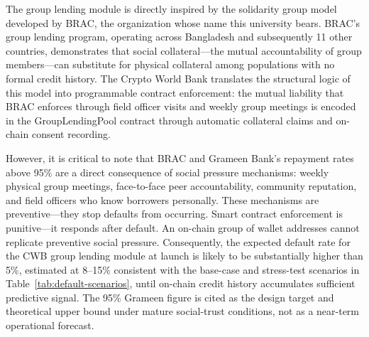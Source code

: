 \documentclass[12pt,a4paper]{report}
\begin{document}
The group lending module is directly inspired by the solidarity group model developed by BRAC, the organization whose name this university bears. BRAC's group lending program, operating across Bangladesh and subsequently 11 other countries, demonstrates that social collateral---the mutual accountability of group members---can substitute for physical collateral among populations with no formal credit history. The Crypto World Bank translates the structural logic of this model into programmable contract enforcement: the mutual liability that BRAC enforces through field officer visits and weekly group meetings is encoded in the GroupLendingPool contract through automatic collateral claims and on-chain consent recording.

However, it is critical to note that BRAC and Grameen Bank's repayment rates above 95\% are a direct consequence of social pressure mechanisms: weekly physical group meetings, face-to-face peer accountability, community reputation, and field officers who know borrowers personally. These mechanisms are preventive---they stop defaults from occurring. Smart contract enforcement is punitive---it responds after default. An on-chain group of wallet addresses cannot replicate preventive social pressure. Consequently, the expected default rate for the CWB group lending module at launch is likely to be substantially higher than 5\%, estimated at 8--15\% consistent with the base-case and stress-test scenarios in Table~\ref{tab:default-scenarios}, until on-chain credit history accumulates sufficient predictive signal. The 95\% Grameen figure is cited as the design target and theoretical upper bound under mature social-trust conditions, not as a near-term operational forecast.
\end{document}
